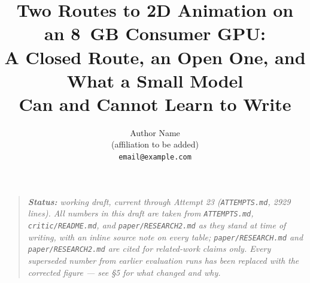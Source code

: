 \documentclass[11pt]{article}
\title{Two Routes to 2D Animation on an 8~GB Consumer GPU:\\
A Closed Route, an Open One, and What a Small Model\\
Can and Cannot Learn to Write}
\author{Author Name \\ \small (affiliation to be added) \\ \small \texttt{email@example.com}}
\date{}
\newcommand{\secsym}{\S}
\begin{document}
\maketitle

\begin{quote}
\small\itshape
\textbf{Status:} working draft, current through Attempt 23
(\texttt{ATTEMPTS.md}, 2929 lines). All numbers in this draft are taken
from \texttt{ATTEMPTS.md}, \texttt{critic/README.md}, and
\texttt{paper/RESEARCH2.md} as they stand at time of writing, with an
inline source note on every table; \texttt{paper/RESEARCH.md} and
\texttt{paper/RESEARCH2.md} are cited for related-work claims only. Every
superseded number from earlier evaluation runs has been replaced with the
corrected figure --- see \secsym5 for what changed and why.
\end{quote}
\end{document}
